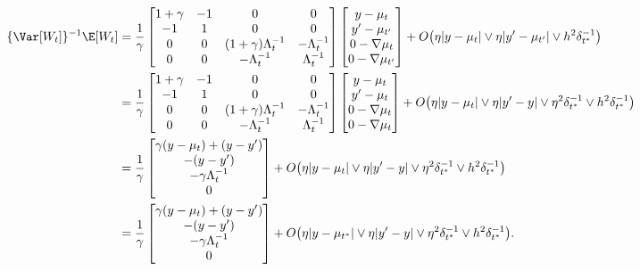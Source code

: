 \documentclass{article}
\begin{document}
	\begin{align*}
		\{\Var[W_t]\}^{-1}\E[W_t] 
		& = 
		\frac{1}{\gamma} 
		\begin{bmatrix}
			1 + \gamma & -1 & 0 & 0 \\
			-1 & 1 & 0 & 0 \\
			0 & 0 & (1 + \gamma)\Lambda_t^{-1} & -\Lambda_{t}^{-1} \\
			0 & 0 & -\Lambda_t^{-1} & \Lambda_{t}^{-1}
		\end{bmatrix}
		\begin{bmatrix}
			y - \mu_t \\
			y' - \mu_{t'} \\
			0 - \nabla \mu_t \\
			0 - \nabla \mu_{t'}
		\end{bmatrix}
		+ O\big(\eta|y - \mu_{t}| \vee \eta|y' - \mu_{t'}| \vee h^2 \delta_{t^*}^{-1}\big) \\
		& = 
		\frac{1}{\gamma} 
		\begin{bmatrix}
			1 + \gamma & -1 & 0 & 0 \\
			-1 & 1 & 0 & 0 \\
			0 & 0 & (1 + \gamma)\Lambda_t^{-1} & -\Lambda_{t}^{-1} \\
			0 & 0 & -\Lambda_t^{-1} & \Lambda_{t}^{-1}
		\end{bmatrix}
		\begin{bmatrix}
			y - \mu_t \\
			y' - \mu_t \\
			0 - \nabla \mu_t \\
			0 - \nabla \mu_{t}
		\end{bmatrix}
		+ O\big(\eta|y - \mu_{t}| \vee \eta|y' - y| \vee \eta^2 \delta_{t^*}^{-1} \vee h^2 \delta_{t^*}^{-1}\big) \\
		& = 
		\frac{1}{\gamma}
		\begin{bmatrix}
			\gamma(y - \mu_t) + (y - y') \\
			-(y - y') \\
			-\gamma \Lambda_t^{-1} \\
			0
		\end{bmatrix}
		+ O\big(\eta|y - \mu_{t}| \vee \eta|y' - y| \vee \eta^2 \delta_{t^*}^{-1} \vee h^2 \delta_{t^*}^{-1}\big) \\
		& = \frac{1}{\gamma}
		\begin{bmatrix}
			\gamma(y - \mu_t) + (y - y') \\
			-(y - y') \\
			-\gamma \Lambda_t^{-1} \\
			0
		\end{bmatrix}
		+ O\big(\eta|y - \mu_{t^*}| \vee \eta|y' - y| \vee \eta^2 \delta_{t^*}^{-1} \vee h^2 \delta_{t^*}^{-1}\big).
	\end{align*}
\end{document}
